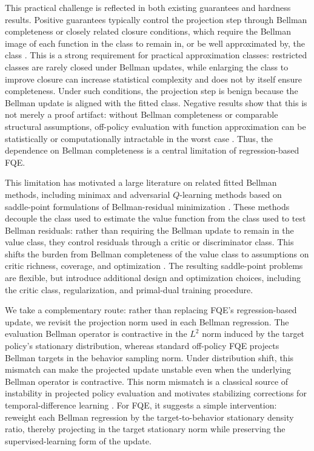 \documentclass{article}
\theoremstyle{plain}
\theoremstyle{definition}
\theoremstyle{remark}
\begin{document}
This practical challenge is reflected in both existing guarantees and hardness
results. Positive guarantees typically control the projection step through
Bellman completeness or closely related closure conditions, which require the
Bellman image of each function in the class to remain in, or be well
approximated by, the class
\citep{munos2008finite,scherrer2014approximate,fan2020theoretical,
hu2025fast}. This is a strong requirement for practical approximation classes:
restricted classes are rarely closed under Bellman updates, while enlarging the
class to improve closure can increase statistical complexity and does not by
itself ensure completeness. Under such conditions, the projection step is benign
because the Bellman update is aligned with the fitted class. Negative results
show that this is not merely a proof artifact: without Bellman completeness or
comparable structural assumptions, off-policy evaluation with function
approximation can be statistically or computationally intractable in the worst
case
\citep{chen2019information,foster2021offline,xie2022role,amortila2026unifying}.
Thus, the dependence on Bellman completeness is a central limitation of
regression-based FQE.

This limitation has motivated a large literature on related fitted Bellman
methods, including minimax and adversarial \(Q\)-learning methods based on
saddle-point formulations of Bellman-residual minimization
\citep{dai2018sbeed,uehara2020minimax,feng2020accountable,xie2020q,
xie2021bellman,uehara2023offline,chen2022well,zanette2022bellman}. These
methods decouple the class used to estimate the value function from the class
used to test Bellman residuals: rather than requiring the Bellman update to
remain in the value class, they control residuals through a critic or
discriminator class. This shifts the burden from Bellman completeness of the
value class to assumptions on critic richness, coverage, and optimization
\citep{feng2019kernel,jiang2020minimax,uehara2021finite,zanette2022bellman}.
The resulting saddle-point problems are flexible, but introduce additional
design and optimization choices, including the critic class, regularization,
and primal-dual training procedure.

We take a complementary route: rather than replacing FQE's regression-based
update, we revisit the projection norm used in each Bellman regression. The
evaluation Bellman operator is contractive in the \(L^2\) norm induced by the
target policy's stationary distribution, whereas standard off-policy FQE
projects Bellman targets in the behavior sampling norm. Under distribution
shift, this mismatch can make the projected update unstable even when the
underlying Bellman operator is contractive. This norm mismatch is a classical
source of instability in projected policy evaluation
\citep{tsitsiklis1996analysis} and motivates stabilizing corrections for
temporal-difference learning
\citep{mahmood2015emphatic,sutton2016emphatic,patterson2022generalized}. For
FQE, it suggests a simple intervention: reweight each Bellman regression by the
target-to-behavior stationary density ratio, thereby projecting in the target
stationary norm while preserving the supervised-learning form of the update.
\end{document}
